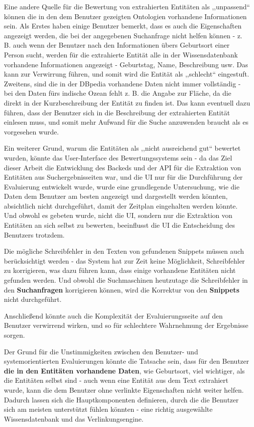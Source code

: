 Eine andere Quelle für die Bewertung von extrahierten Entitäten als ,,unpassend`` können die in den dem Benutzer gezeigten Ontologien vorhandene Informationen sein. Als Erstes haben einige Benutzer bemerkt, dass es auch die Eigenschaften angezeigt werden, die bei der angegebenen Suchanfrage nicht helfen können - z. B. auch wenn der Benutzer nach den Informationen übers Geburtsort einer Person sucht, werden für die extrahierte Entität alle in der Wissensdatenbank vorhandene Informationen angezeigt - Geburtstag, Name, Beschreibung usw. Das kann zur Verwirrung führen, und somit wird die Entität als ,,schlecht`` eingestuft. Zweitens, sind die in der DBpedia vorhandene Daten nicht immer vollständig - bei den Daten fürs indische Ozean fehlt z. B. die Angabe zur Fläche, da die direkt in der Kurzbeschreibung der Entität zu finden ist. Das kann eventuell dazu führen, dass der Benutzer sich in die Beschreibung der extrahierten Entität einlesen muss, und somit mehr Aufwand für die Suche anzuwenden braucht als es vorgesehen wurde. 

Ein weiterer Grund, warum die Entitäten als ,,nicht ausreichend gut`` bewertet wurden, könnte das User-Interface des Bewertungssystems sein - da das Ziel dieser Arbeit die Entwicklung des Backeds und der API für die Extraktion von Entitäten aus Suchergebnisseiten war, und die UI nur für die Durchführung der Evaluierung entwickelt wurde, wurde eine grundlegende Untersuchung, wie die Daten dem Benutzer am besten angezeigt und dargestellt werden könnten, absichtlich nicht durchgeführt, damit der Zeitplan eingehalten werden könnte. Und obwohl es gebeten wurde, nicht die UI, sondern nur die Extraktion von Entitäten an sich selbst zu bewerten, beeinflusst die UI die Entscheidung des Benutzers trotzdem.

Die mögliche Schreibfehler in den Texten von gefundenen Snippets müssen auch berücksichtigt werden - das System hat zur Zeit keine Möglichkeit, Schreibfehler zu korrigieren, was dazu führen kann, dass einige vorhandene Entitäten nicht gefunden werden. Und obwohl die Suchmaschinen heutzutage die Schreibfehler in den \textbf{Suchanfragen} korrigieren können, wird die Korrektur von den \textbf{Snippets} nicht durchgeführt.

Anschließend könnte auch die Komplexität der Evaluierungsseite auf den Benutzer verwirrend wirken, und so für schlechtere Wahrnehmung der Ergebnisse sorgen.

Der Grund für die Unstimmigkeiten zwischen den Benutzer- und systemorientierten Evaluierungen könnte die Tatsache sein, dass für den Benutzer \textbf{die in den Entitäten vorhandene Daten}, wie Geburtsort, viel wichtiger, als die Entitäten selbst sind - auch wenn eine Entität aus dem Text extrahiert wurde, kann die dem Benutzer ohne verlinkte Eigenschaften nicht weiter helfen. Dadurch lassen sich die Hauptkomponenten definieren, durch die die Benutzer sich am meisten unterstützt fühlen könnten - eine richtig ausgewählte Wissensdatenbank und das Verlinkungsengine.
